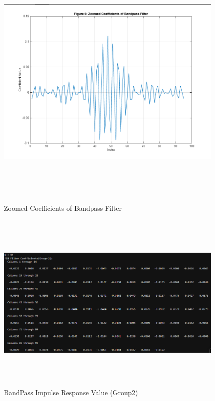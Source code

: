 \documentclass[12pt]{article}
\begin{document}
\begin{figure}[H]
    \centering
    \includegraphics[height=13cm]{g26.png}
    \caption{Zoomed Coefficients of Bandpass Filter}
    \label{fig:zoomed_coefficients_g2}
\end{figure}

\begin{figure}[H]
    \centering
    \includegraphics[height=9cm]{g29.png}
    \caption{BandPass Impulse Response Value (Group2)}
    \label{fig:fir_coefficients_g2}
\end{figure}
\end{document}

